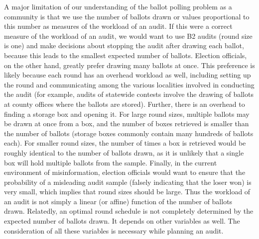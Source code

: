 A major limitation of our understanding of the ballot polling problem as a community is that we use the number of ballots drawn or values proportional to this number \cite{mclaughlin_thesis,bernhard-diss,RI-report} as measures of the workload of an audit. If this were a correct measure of the workload of an audit, we would want to use B2 audits (round size is one) and make decisions about stopping the audit after drawing each ballot, because this leads to the smallest expected number of ballots. Election officials, on the other hand, greatly prefer drawing many ballots at once. This preference is likely because each round has an overhead workload as well, including setting up the round and communicating among the various localities involved in conducting the audit (for example, audits of statewide contests involve the drawing of ballots at county offices where the ballots are stored). Further, there is an overhead to finding a storage box and opening it. For large round sizes, multiple ballots may be drawn at once from a box, and the number of boxes retrieved is smaller than the number of ballots (storage boxes commonly contain many hundreds of ballots each). For smaller round sizes, the number of times a box is retrieved would be roughly identical to the number of ballots drawn, as it is unlikely that a single box will hold multiple ballots from the sample. Finally, in the current environment of misinformation, election officials would want to ensure that the probability of a misleading audit sample (falsely indicating that the loser won) is very small, which implies that round sizes should be large. Thus the workload of an audit is not simply a linear (or affine) function of the number of ballots drawn. Relatedly, an optimal round schedule is not completely determined by the expected number of ballots drawn. It depends on other variables as well. The consideration of all these variables is necessary while planning an audit. 

